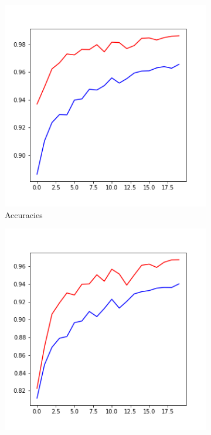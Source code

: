 \documentclass[10pt,conference,compsocconf]{IEEEtran}
\begin{document}
\begin{figure}[ht]
    \centering
    \begin{subfigure}{0.31\linewidth}
        \includegraphics[width=\linewidth]{doc/images/accuracies.png}
        \caption{Accuracies}
    \end{subfigure}
    \begin{subfigure}{0.31\linewidth}
        \includegraphics[width=\linewidth]{doc/images/F1_scores.png}

\end{subfigure}
\end{figure}
\end{document}
